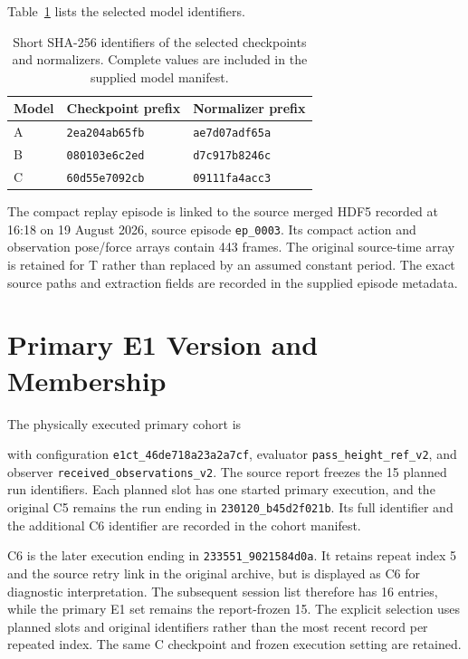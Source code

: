 Table~\ref{tab:model_provenance} lists the selected model identifiers.

\begin{table}[tbp]\centering\small
\caption[Selected model identifiers]{Short SHA-256 identifiers of the selected checkpoints and normalizers. Complete values are included in the supplied model manifest.}
\label{tab:model_provenance}
\begin{tabular}{lll}
\toprule Model & Checkpoint prefix & Normalizer prefix \\ \midrule
A & \texttt{2ea204ab65fb} & \texttt{ae7d07adf65a} \\
B & \texttt{080103e6c2ed} & \texttt{d7c917b8246c} \\
C & \texttt{60d55e7092cb} & \texttt{09111fa4acc3} \\
\bottomrule
\end{tabular}
\end{table}

The compact replay episode is linked to the source merged HDF5 recorded at 16:18 on 19 August 2026, source episode \texttt{ep\_0003}. Its compact action and observation pose/force arrays contain 443 frames. The original source-time array is retained for T rather than replaced by an assumed constant period. The exact source paths and extraction fields are recorded in the supplied episode metadata.

\section{Primary E1 Version and Membership}
The physically executed primary cohort is
\begin{quote}\small{}\end{quote}
with configuration \texttt{e1ct\_46de718a23a2a7cf}, evaluator \texttt{pass\_height\_ref\_v2}, and observer \texttt{received\_observations\_v2}. The source report freezes the 15 planned run identifiers. Each planned slot has one started primary execution, and the original C5 remains the run ending in \texttt{230120\_b45d2f021b}. Its full identifier and the additional C6 identifier are recorded in the cohort manifest.

C6 is the later execution ending in \texttt{233551\_9021584d0a}. It retains repeat index 5 and the source retry link in the original archive, but is displayed as C6 for diagnostic interpretation. The subsequent session list therefore has 16 entries, while the primary E1 set remains the report-frozen 15. The explicit selection uses planned slots and original identifiers rather than the most recent record per repeated index. The same C checkpoint and frozen execution setting are retained.

